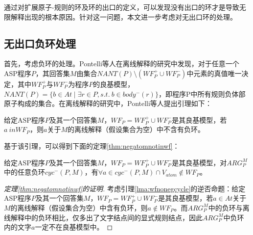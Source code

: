 通过对扩展原子-规则的环及环的出口的定义，可以发现没有出口的环才是导致无限解释出现的根本原因。针对这一问题，本文进一步考虑对无出口环的处理。
\subsection{无出口负环处理}
首先，考虑负环的处理。Pontelli等人在离线解释的研究中发现，对于任意一个ASP程序$P$，其回答集$M$由集合$NANT(P) \setminus (WF^+_P \cup WF^-_P)$中元素的真值唯一决定\cite{pontelli2006justifications}，其中$WF^+_P$与$WF^-_P$为程序$P$的良基模型，$NANT(P)=\{b \in At \mid \exists r \in P, s.t.\ b \in body^-(r)\}$，即程序P中所有规则负体部原子构成的集合。在离线解释的研究中，Pontelli等人提出引理如下\cite{pontelli2009justifications}：
\begin{lemma}
    \label{lma:wfnonegcycle}
    给定ASP程序$P$及其一个回答集$M$，$WF_P=WF^+_P \cup WF^-_P$是其良基模型，若$a \ in WF_P$，则$a$关于$M$的离线解释（假设集合为空）中不含有负环。
\end{lemma}

基于该引理，可以得到下面的定理\ref{thm:negatomnotinwf}：%
\begin{theorem}[负环原子不在良基模型中]
    \label{thm:negatomnotinwf}
    给定ASP程序$P$及其一个回答集$M$，$WF_P=WF^+_P \cup WF^-_P$是其良基模型，对$ARG^M_P$中的任意负环$cyc^-(P, M)$，有$\forall a \in cyc^-(P, M) \cap V_{atom} \notin WF_P$。
\end{theorem}

\begin{proof}[定理\ref{thm:negatomnotinwf}的证明]
    考虑引理\ref{lma:wfnonegcycle}的逆否命题：给定ASP程序$P$及其一个回答集$M$，$WF_P=WF^+_P \cup WF^-_P$是其良基模型，若$a \in At$关于$M$的离线解释（假设集合为空）中含有负环，则$a \notin WF_P$。而$ARG^M_P$中的负环与离线解释中的负环相比，仅多出了文字结点间的显式规则结点，因此$ARG^M_P$中负环内的文字$a$一定不在良基模型中。
\end{proof}

